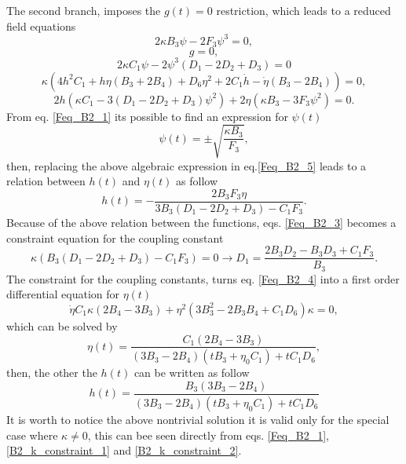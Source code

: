 \documentclass{article}
\begin{document}
The second branch, imposes the $g(t) = 0$ restriction, which leads to a reduced field equations
\begin{dmath}
    \label{Feq_B2_1}
    2\kappa B_3 \psi - 2F_3\psi^3= 0,
\end{dmath}
\begin{dmath}
    \label{Feq_B2_2}
    g = 0,
\end{dmath}
\begin{dmath}
    \label{Feq_B2_3}
    2\kappa C_1\psi - 2\psi^3 \left(D_1 - 2D_2 + D_3\right) = 0
\end{dmath}
\begin{dmath}
    \label{Feq_B2_4}
    \kappa\left(4h^2C_1 + h\eta\left(B_3 + 2B_4\right) + D_6\eta^2 + 2C_1\dot{h} - \dot{\eta}\left(B_3 - 2B_4\right)\right) = 0,
\end{dmath}
\begin{dmath}
    \label{Feq_B2_5}
    2h \left(\kappa C_1 - 3\left(D_1 - 2D_2 + D_3\right) \psi^2\right) + 2\eta\left(\kappa B_3 - 3F_3\psi^2\right) = 0.
\end{dmath}
From eq. \eqref{Feq_B2_1} its possible to find an expression for $\psi(t)$
\begin{equation}
    \psi(t) = \pm \sqrt{\frac{\kappa B_3}{F_3}},
\end{equation}
then, replacing the above algebraic expression in eq.\eqref{Feq_B2_5} leads to a relation between $h(t)$ and $\eta(t)$ as follow
\begin{equation}
    h(t) = - \frac{2B_3F_3 \eta}{3B_3 \left(D_1 - 2D_2 + D_3\right) - C_1F_3}.
\end{equation}
Because of the above relation between the functions, eqs. \eqref{Feq_B2_3} becomes a constraint equation for the coupling constant
\begin{equation}
    \label{B2_k_constraint_1}
    \kappa\left(B_3\left(D_1 -2D_2 + D_3\right) - C_1F_3\right) = 0 \to D_1 = \frac{2B_3D_2 - B_3D_3 + C_1F_3}{B_3}.
\end{equation} 
The constraint for the coupling constants, turns eq. \eqref{Feq_B2_4} into a first order differential equation for $\eta(t)$
\begin{equation}
    \label{B2_k_constraint_2}
    \dot{\eta}C_1 \kappa \left(2B_4 - 3B_3\right) + \eta^2 \left(3B_3^2 - 2B_3 B_4 + C_1D_6\right)\kappa = 0,
\end{equation}
which can be solved by
\begin{equation}
    \eta(t) = \frac{C_1\left(2B_4 - 3B_3\right)}{\left(3B_3 - 2B_4\right)\left(tB_3 + \eta_0 C_1\right) + tC_1D_6},
\end{equation}
then, the other the $h(t)$ can be written as follow
\begin{equation}
    h(t) = \frac{B_3\left(3B_3 - 2B_4\right)}{\left(3B_3 - 2B_4\right)\left(tB_3 + \eta_0 C_1\right) + tC_1D_6} 
\end{equation}
It is worth to notice the above nontrivial solution it is valid only for the special case where $\kappa \neq 0$, 
this can bee seen directly from eqs. \eqref{Feq_B2_1}, \eqref{B2_k_constraint_1} and \eqref{B2_k_constraint_2}. 
\end{document}
